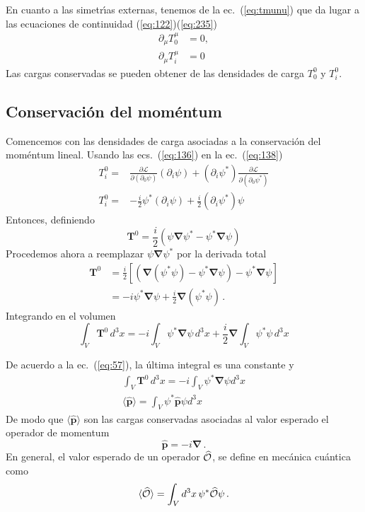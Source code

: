 En cuanto a las simetr\'\i as externas, tenemos de la ec.~(\ref{eq:tmunu}) que
da lugar a las ecuaciones de continuidad (\ref{eq:122})(\ref{eq:235})
\begin{align}
  \partial_\mu T^\mu_0&=0,\nonumber\\
\partial_\mu{T}^\mu_i&=0
\end{align}
Las cargas conservadas se pueden obtener de las densidades de carga
$T^0_0$ y $T^0_i$. 

\subsection{Conservación del moméntum}
Comencemos con las densidades de carga asociadas a
la conservación del moméntum lineal.
Usando  las ecs.~(\ref{eq:136}) en la ec.~(\ref{eq:138})
\begin{align}
  T^0_i=&\frac{\partial\mathcal{L}}{\partial(\partial_0\psi)}(\partial_i\psi)
  +(\partial_i\psi^*)\frac{\partial\mathcal{L}}{\partial(\partial_0\psi^*)}\nonumber\\
  T^0_i=&-\frac{i}{2}\psi^*(\partial_i\psi)+\frac{i}{2}(\partial_i\psi^*)\psi
\end{align}
Entonces, definiendo
\begin{equation}
   \mathbf{T}^0=\frac{i}{2}
  \left(
    \psi\boldsymbol{\nabla}\psi^*-\psi^*\boldsymbol{\nabla}\psi
  \right)
\end{equation}
Procedemos ahora a reemplazar $\psi\boldsymbol{\nabla}\psi^*$ por la
derivada total
\begin{align}
 \mathbf{T}^0&=\frac{i}{2}
  \left[\left( 
    \boldsymbol{\nabla}(\psi^*\psi)-\psi^*\boldsymbol{\nabla}\psi \right)-\psi^*\boldsymbol{\nabla}\psi
  \right]\nonumber\\
&=-i\psi^*\boldsymbol{\nabla}\psi+\frac{i}{2}\boldsymbol{\nabla}(\psi^*\psi)\,.
\end{align}
Integrando en el volumen
\begin{equation}
  \int_V \mathbf{T}^0\, d^3x=-i\int_V \psi^*\boldsymbol{\nabla}\psi\, d^3x+\frac{i}{2}\boldsymbol{\nabla}\int_V\psi^*\psi\,d^3x
\end{equation}
\begin{frame}
De acuerdo a la ec.~(\ref{eq:57}), la \'ultima integral es una constante y
\begin{align}
  \label{eq:140}
  \int_V \mathbf{T}^0\, d^3x=-i\int_V \psi^*\boldsymbol{\nabla}\psi d^3x\nonumber\\
\langle\widehat{\mathbf{p}}\rangle=\int_V \psi^*\widehat{\mathbf{p}}\psi d^3x
\end{align}
De modo que $\langle\widehat{\mathbf{p}}\rangle$ son las cargas conservadas asociadas al valor esperado el operador de momentum
\begin{equation}
  \widehat{\mathbf{p}}=-i\boldsymbol{\nabla}\,.
\end{equation}
En general, el valor esperado de un operador $ \widehat{\cal O}$, se define en mecánica cuántica como
\begin{align*}
  \langle\widehat{\cal O}\rangle=\int_V d^3x\,\psi^{*}\widehat{\cal O}\psi\,.
\end{align*}
\end{frame}
